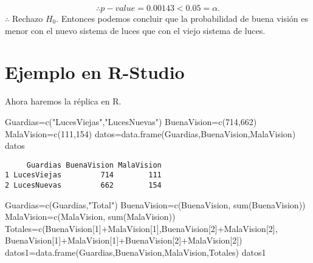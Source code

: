 \documentclass[
  a4paper,
  oneside,
  openany]{book}
\newenvironment{Shaded}{\begin{snugshade}}{\end{snugshade}}
\newcommand{\DecValTok}[1]{\textcolor[rgb]{0.00,0.00,0.81}{#1}}
\newcommand{\FunctionTok}[1]{\textcolor[rgb]{0.00,0.00,0.00}{#1}}
\newcommand{\NormalTok}[1]{#1}
\newcommand{\OtherTok}[1]{\textcolor[rgb]{0.56,0.35,0.01}{#1}}
\newcommand{\SpecialCharTok}[1]{\textcolor[rgb]{0.00,0.00,0.00}{#1}}
\newcommand{\StringTok}[1]{\textcolor[rgb]{0.31,0.60,0.02}{#1}}
\begin{document}
\[\therefore p-value=0.00143 < 0.05=\alpha.\]
\(\therefore\) Rechazo \(H_0\). Entonces podemos concluir que la probabilidad de buena visión es menor con el nuevo sistema de luces que con el viejo sistema de luces.

\hypertarget{ejemplo-en-r-studio-9}{%
\section{Ejemplo en R-Studio}\label{ejemplo-en-r-studio-9}}

Ahora haremos la réplica en R.

\begin{Shaded}
\begin{Highlighting}[]
\NormalTok{Guardias}\OtherTok{=}\FunctionTok{c}\NormalTok{(}\StringTok{"LucesViejas"}\NormalTok{,}\StringTok{"LucesNuevas"}\NormalTok{)}
\NormalTok{BuenaVision}\OtherTok{=}\FunctionTok{c}\NormalTok{(}\DecValTok{714}\NormalTok{,}\DecValTok{662}\NormalTok{)}
\NormalTok{MalaVision}\OtherTok{=}\FunctionTok{c}\NormalTok{(}\DecValTok{111}\NormalTok{,}\DecValTok{154}\NormalTok{)}
\NormalTok{datos}\OtherTok{=}\FunctionTok{data.frame}\NormalTok{(Guardias,BuenaVision,MalaVision)}
\NormalTok{datos}
\end{Highlighting}
\end{Shaded}

\begin{verbatim}
     Guardias BuenaVision MalaVision
1 LucesViejas         714        111
2 LucesNuevas         662        154
\end{verbatim}

\begin{Shaded}
\begin{Highlighting}[]
\NormalTok{Guardias}\OtherTok{=}\FunctionTok{c}\NormalTok{(Guardias,}\StringTok{"Total"}\NormalTok{)}
\NormalTok{BuenaVision}\OtherTok{=}\FunctionTok{c}\NormalTok{(BuenaVision, }\FunctionTok{sum}\NormalTok{(BuenaVision))}
\NormalTok{MalaVision}\OtherTok{=}\FunctionTok{c}\NormalTok{(MalaVision, }\FunctionTok{sum}\NormalTok{(MalaVision))}
\NormalTok{Totales}\OtherTok{=}\FunctionTok{c}\NormalTok{(BuenaVision[}\DecValTok{1}\NormalTok{]}\SpecialCharTok{+}\NormalTok{MalaVision[}\DecValTok{1}\NormalTok{],BuenaVision[}\DecValTok{2}\NormalTok{]}\SpecialCharTok{+}\NormalTok{MalaVision[}\DecValTok{2}\NormalTok{],}
\NormalTok{           BuenaVision[}\DecValTok{1}\NormalTok{]}\SpecialCharTok{+}\NormalTok{MalaVision[}\DecValTok{1}\NormalTok{]}\SpecialCharTok{+}\NormalTok{BuenaVision[}\DecValTok{2}\NormalTok{]}\SpecialCharTok{+}\NormalTok{MalaVision[}\DecValTok{2}\NormalTok{])}
\NormalTok{datos1}\OtherTok{=}\FunctionTok{data.frame}\NormalTok{(Guardias,BuenaVision,MalaVision,Totales)}
\NormalTok{datos1}
\end{Highlighting}
\end{Shaded}
\end{document}
